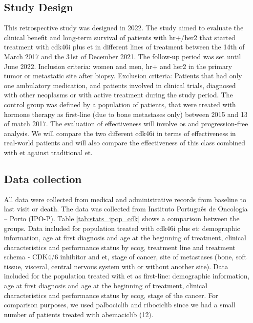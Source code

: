 

\subsection{Study Design}

This retrospective study was designed in 2022. The study aimed to evaluate the clinical benefit and long-term survival of patients with \ac{hr+}/\ac{her2} that started treatment with \ac{cdk46i} plus \ac{et} in different lines of treatment between the 14th of March 2017 and the 31st of December 2021. The follow-up period was set until June 2022. Inclusion criteria: women and men, \ac{hr+} and \ac{her2} in the primary tumor or metastatic site after biopsy. Exclusion criteria: Patients that had only one ambulatory medication, and patients involved in clinical trials, diagnosed with other neoplasms or with active treatment during the study period. The control group was defined by a population of patients, that were treated with hormone therapy as first-line (due to bone metastases only) between 2015 and 13 of match 2017.
The evaluation of effectiveness will involve \ac{os} and progression-free analysis. We will compare the two different \ac{cdk46i} in terms of effectiveness in real-world patients and will also compare the effectiveness of this class combined with \ac{et} against traditional \ac{et}.


\subsection{Data collection}
All data were collected from medical and administrative records from baseline to last visit or death. The data was collected from Instituto Português de Oncologia – Porto (IPO-P). Table \ref{tab:stats_ipop_cdk} shows a comparison between the groups.
Data included for population treated with \ac{cdk46i} plus \ac{et}: demographic information, age at first diagnosis and age at the beginning of treatment, clinical characteristics and performance status by  \ac{ecog}, treatment line and treatment schema - CDK4/6 inhibitor and \ac{et}, stage of cancer, site of metastases (bone, soft tissue, visceral, central nervous system with or without another site).
Data included for the population treated with \ac{et} as first-line: demographic information, age at first diagnosis and age at the beginning of treatment, clinical characteristics and performance status by  \ac{ecog}, stage of the cancer.
For comparison purposes, we used palbociclib and ribociclib since we had a small number of patients treated with abemaciclib (12).

